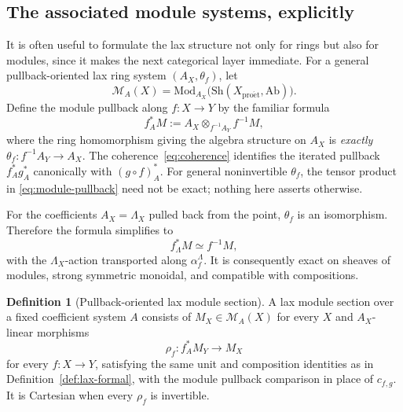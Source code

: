 \documentclass[11pt,a4paper]{article}
\numberwithin{equation}{section}
\theoremstyle{definition}
\newtheorem{definition}[theorem]{Definition}
\theoremstyle{remark}
\newcommand{\Sh}{\mathrm{Sh}}
\newcommand{\Mod}{\mathrm{Mod}}
\newcommand{\proet}{\mathrm{pro\acute{e}t}}
\newcommand{\MM}{\mathcal M}
\begin{document}
\subsection{The associated module systems, explicitly}

It is often useful to formulate the lax structure not only for rings
but also for modules, since it makes the next categorical layer immediate.
For a general pullback-oriented lax ring system $(A_X,\theta_f)$,
let
\[
   \MM_A(X)=\Mod_{A_X}\bigl(\Sh(X_{\proet},\mathrm{Ab})\bigr).
\]
Define the module pullback along $f:X\to Y$ by the familiar formula
\begin{equation}\label{eq:module-pullback}
    f_A^*M
    := A_X\otimes_{f^{-1}A_Y}f^{-1}M,
\end{equation}
where the ring homomorphism giving the algebra structure on $A_X$ is
\emph{exactly} $\theta_f:f^{-1}A_Y\to A_X$.
The coherence~\eqref{eq:coherence} identifies the iterated pullback
$f_A^*g_A^*$ canonically with $(g\circ f)_A^*$.
For general noninvertible $\theta_f$, the tensor product in
\eqref{eq:module-pullback} need not be exact; nothing here asserts
otherwise.

For the coefficients $A_X=\Lambda_X$ pulled back from the point,
$\theta_f$ is an isomorphism.  Therefore the formula simplifies to
\begin{equation}\label{eq:module-simple}
      \boxed{\quad
        f_\Lambda^*M\simeq f^{-1}M,
     \quad}
\end{equation}
with the $\Lambda_X$-action transported along
$\alpha_f^\Lambda$.  It is consequently exact on sheaves of modules,
strong symmetric monoidal, and compatible with compositions.

\begin{definition}[Pullback-oriented lax module section]
A lax module section over a fixed coefficient system $A$ consists of
$M_X\in\MM_A(X)$ for every $X$ and $A_X$-linear morphisms
\[
          \rho_f:f_A^*M_Y\longrightarrow M_X
\]
for every $f:X\to Y$, satisfying the same unit and composition
identities as in Definition~\ref{def:lax-formal}, with the module
pullback comparison in place of $c_{f,g}$.  It is Cartesian when every
$\rho_f$ is invertible.
\end{definition}
\end{document}
